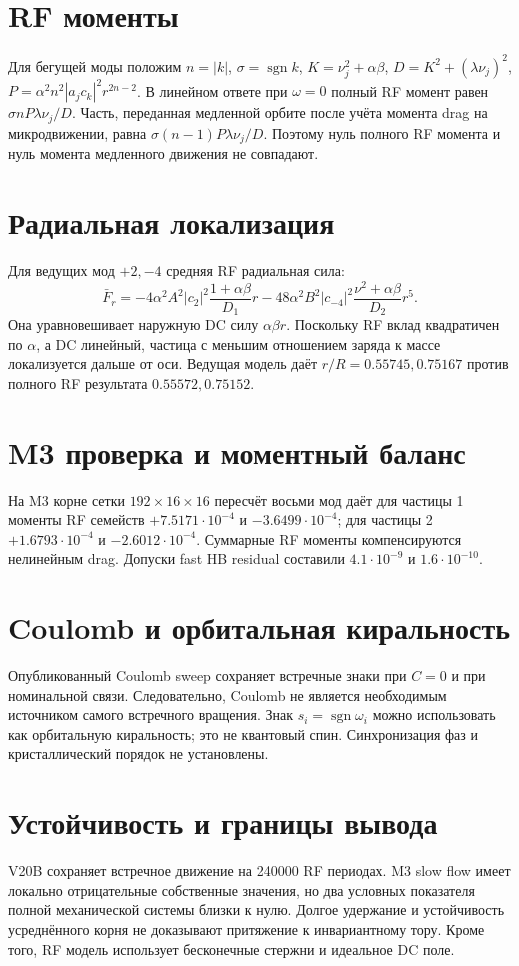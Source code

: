 \documentclass[11pt]{article}
\begin{document}
\section{RF моменты}
Для бегущей моды положим $n=|k|$, $\sigma=\operatorname{sgn}k$, $K=\nu_j^2+\alpha\beta$, $D=K^2+(\lambda\nu_j)^2$, $P=\alpha^2n^2|a_jc_k|^2r^{2n-2}$. В линейном ответе при $\omega=0$ полный RF момент равен $\sigma nP\lambda\nu_j/D$. Часть, переданная медленной орбите после учёта момента drag на микродвижении, равна $\sigma(n-1)P\lambda\nu_j/D$. Поэтому нуль полного RF момента и нуль момента медленного движения не совпадают.
\section{Радиальная локализация}
Для ведущих мод $+2,-4$ средняя RF радиальная сила:
\[
\bar F_r=-4\alpha^2A^2|c_2|^2\frac{1+\alpha\beta}{D_1}r
-48\alpha^2B^2|c_{-4}|^2\frac{\nu^2+\alpha\beta}{D_2}r^5.
\]
Она уравновешивает наружную DC силу $\alpha\beta r$. Поскольку RF вклад квадратичен по $\alpha$, а DC линейный, частица с меньшим отношением заряда к массе локализуется дальше от оси. Ведущая модель даёт $r/R=0.55745,0.75167$ против полного RF результата $0.55572,0.75152$.
\section{M3 проверка и моментный баланс}
На M3 корне сетки $192\times16\times16$ пересчёт восьми мод даёт для частицы 1 моменты RF семейств $+7.5171\cdot10^{-4}$ и $-3.6499\cdot10^{-4}$; для частицы 2 $+1.6793\cdot10^{-4}$ и $-2.6012\cdot10^{-4}$. Суммарные RF моменты компенсируются нелинейным drag. Допуски fast HB residual составили $4.1\cdot10^{-9}$ и $1.6\cdot10^{-10}$.
\section{Coulomb и орбитальная киральность}
Опубликованный Coulomb sweep сохраняет встречные знаки при $C=0$ и при номинальной связи. Следовательно, Coulomb не является необходимым источником самого встречного вращения. Знак $s_i=\operatorname{sgn}\omega_i$ можно использовать как орбитальную киральность; это не квантовый спин. Синхронизация фаз и кристаллический порядок не установлены.
\section{Устойчивость и границы вывода}
V20B сохраняет встречное движение на 240000 RF периодах. M3 slow flow имеет локально отрицательные собственные значения, но два условных показателя полной механической системы близки к нулю. Долгое удержание и устойчивость усреднённого корня не доказывают притяжение к инвариантному тору. Кроме того, RF модель использует бесконечные стержни и идеальное DC поле.
\end{document}
